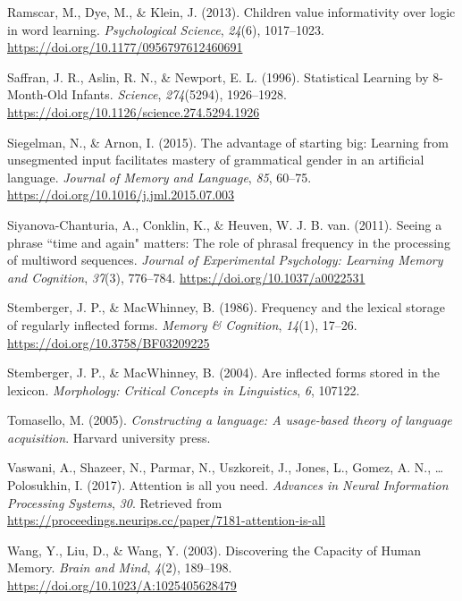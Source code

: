 \documentclass[
  man,floatsintext]{apa6}
\newlength{\cslhangindent}
\newenvironment{CSLReferences}[2] %
 {\begin{list}{}{%
  \setlength{\itemindent}{0pt}
  \setlength{\leftmargin}{0pt}
  \setlength{\parsep}{0pt}
  \ifodd #1
   \setlength{\leftmargin}{\cslhangindent}
   \setlength{\itemindent}{-1\cslhangindent}
  \fi
  \setlength{\itemsep}{#2\baselineskip}}}
 {\end{list}}
\begin{document}
\begin{CSLReferences}{1}{0}
Ramscar, M., Dye, M., \& Klein, J. (2013). Children value informativity over logic in word learning. \emph{Psychological Science}, \emph{24}(6), 1017--1023. \url{https://doi.org/10.1177/0956797612460691}

Saffran, J. R., Aslin, R. N., \& Newport, E. L. (1996). Statistical Learning by 8-Month-Old Infants. \emph{Science}, \emph{274}(5294), 1926--1928. \url{https://doi.org/10.1126/science.274.5294.1926}

Siegelman, N., \& Arnon, I. (2015). The advantage of starting big: Learning from unsegmented input facilitates mastery of grammatical gender in an artificial language. \emph{Journal of Memory and Language}, \emph{85}, 60--75. \url{https://doi.org/10.1016/j.jml.2015.07.003}

Siyanova-Chanturia, A., Conklin, K., \& Heuven, W. J. B. van. (2011). Seeing a phrase {``}time and again{"} matters: The role of phrasal frequency in the processing of multiword sequences. \emph{Journal of Experimental Psychology: Learning Memory and Cognition}, \emph{37}(3), 776--784. \url{https://doi.org/10.1037/a0022531}

Stemberger, J. P., \& MacWhinney, B. (1986). Frequency and the lexical storage of regularly inflected forms. \emph{Memory \& Cognition}, \emph{14}(1), 17--26. \url{https://doi.org/10.3758/BF03209225}

Stemberger, J. P., \& MacWhinney, B. (2004). Are inflected forms stored in the lexicon. \emph{Morphology: Critical Concepts in Linguistics}, \emph{6}, 107122.

Tomasello, M. (2005). \emph{Constructing a language: A usage-based theory of language acquisition}. Harvard university press.

Vaswani, A., Shazeer, N., Parmar, N., Uszkoreit, J., Jones, L., Gomez, A. N., \ldots{} Polosukhin, I. (2017). Attention is all you need. \emph{Advances in Neural Information Processing Systems}, \emph{30}. Retrieved from \url{https://proceedings.neurips.cc/paper/7181-attention-is-all}

Wang, Y., Liu, D., \& Wang, Y. (2003). Discovering the Capacity of Human Memory. \emph{Brain and Mind}, \emph{4}(2), 189--198. \url{https://doi.org/10.1023/A:1025405628479}


\end{CSLReferences}
\end{document}
